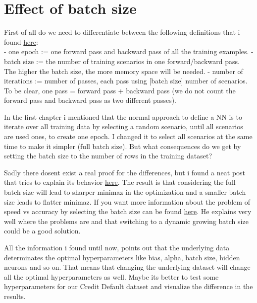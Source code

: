 \documentclass[
]{book}
\begin{document}
\hypertarget{effect-of-batch-size}{%
\chapter{Effect of batch size}\label{effect-of-batch-size}}

First of all do we need to differentiate between the following definitions that i found \href{https://stackoverflow.com/questions/4752626/epoch-vs-iteration-when-training-neural-networks}{here}:\\
- one epoch := one forward pass and backward pass of all the training examples.
- batch size := the number of training scenarios in one forward/backward pass. The higher the batch size, the more memory space will be needed.
- number of iterations := number of passes, each pass using {[}batch size{]} number of scenarios. To be clear, one pass = forward pass + backward pass (we do not count the forward pass and backward pass as two different passes).

In the first chapter i mentioned that the normal approach to define a NN is to iterate over all training data by selecting a random scenario, until all scenarios are used ones, to create one epoch. I changed it to select all scenarios at the same time to make it simpler (full batch size). But what consequences do we get by setting the batch size to the number of rows in the training dataset?

Sadly there dosent exist a real proof for the differences, but i found a neat post that tries to explain its behavior \href{https://stats.stackexchange.com/questions/164876/what-is-the-trade-off-between-batch-size-and-number-of-iterations-to-train-a-neu}{here}. The result is that considering the full batch size will lead to sharper minimaz in the optimization and a smaller batch size leads to flatter minimaz. If you want more information about the problem of speed vs accuracy by selecting the batch size can be found \href{https://medium.com/mini-distill/effect-of-batch-size-on-training-dynamics-21c14f7a716e}{here}. He explains very well where the problems are and that switching to a dynamic growing batch size could be a good solution.

All the information i found until now, points out that the underlying data determinates the optimal hyperparameters like bias, alpha, batch size, hidden neurons and so on. That means that changing the underlying dataset will change all the optimal hyperparameters as well. Maybe its better to test some hyperparameters for our Credit Default dataset and visualize the difference in the results.
\end{document}
